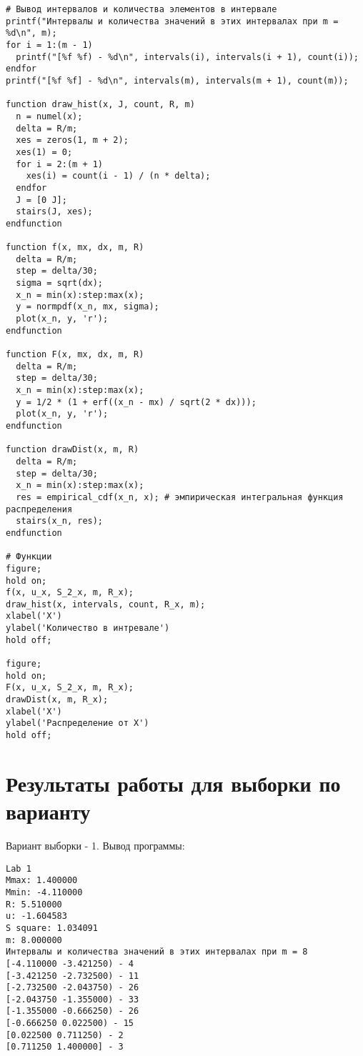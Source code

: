 \begin{lstlisting}
# Вывод интервалов и количества элементов в интервале
printf("Интервалы и количества значений в этих интервалах при m = %d\n", m);
for i = 1:(m - 1)
  printf("[%f %f) - %d\n", intervals(i), intervals(i + 1), count(i));
endfor
printf("[%f %f] - %d\n", intervals(m), intervals(m + 1), count(m));

function draw_hist(x, J, count, R, m)
  n = numel(x);
  delta = R/m;
  xes = zeros(1, m + 2);
  xes(1) = 0;
  for i = 2:(m + 1)
    xes(i) = count(i - 1) / (n * delta);
  endfor
  J = [0 J];
  stairs(J, xes);
endfunction

function f(x, mx, dx, m, R)
  delta = R/m;
  step = delta/30;
  sigma = sqrt(dx);
  x_n = min(x):step:max(x);
  y = normpdf(x_n, mx, sigma);
  plot(x_n, y, 'r');
endfunction

function F(x, mx, dx, m, R)
  delta = R/m;
  step = delta/30;
  x_n = min(x):step:max(x);
  y = 1/2 * (1 + erf((x_n - mx) / sqrt(2 * dx)));
  plot(x_n, y, 'r');
endfunction

function drawDist(x, m, R)
  delta = R/m;
  step = delta/30;
  x_n = min(x):step:max(x);
  res = empirical_cdf(x_n, x); # эмпирическая интегральная функция распределения
  stairs(x_n, res);
endfunction

# Функции
figure;
hold on;
f(x, u_x, S_2_x, m, R_x);
draw_hist(x, intervals, count, R_x, m);
xlabel('X')
ylabel('Количество в интревале')
hold off;

figure;
hold on;
F(x, u_x, S_2_x, m, R_x);
drawDist(x, m, R_x);
xlabel('X')
ylabel('Распределение от X')
hold off;
\end{lstlisting}
\section{Результаты работы для выборки по варианту}
Вариант выборки - 1.
Вывод программы:
\begin{lstlisting}
Lab 1
Mmax: 1.400000
Mmin: -4.110000
R: 5.510000
u: -1.604583
S square: 1.034091
m: 8.000000
Интервалы и количества значений в этих интервалах при m = 8
[-4.110000 -3.421250) - 4
[-3.421250 -2.732500) - 11
[-2.732500 -2.043750) - 26
[-2.043750 -1.355000) - 33
[-1.355000 -0.666250) - 26
[-0.666250 0.022500) - 15
[0.022500 0.711250) - 2
[0.711250 1.400000] - 3
\end{lstlisting}

\begin{figure}[H]
	\center{\texttt{[image: 1]}}
\end{figure}

\begin{figure}[H]
	\center{\texttt{[image: 2]}}
\end{figure}